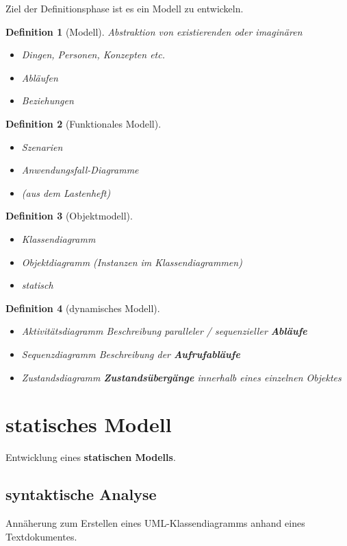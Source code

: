 \documentclass[a4paper]{article}
\theoremstyle{break}
\newtheorem{defi}{Definition}[section]
\begin{document}
Ziel der Definitionsphase ist es ein Modell zu entwickeln. 

\begin{defi}[Modell]
	Abstraktion von existierenden oder imaginären
	\begin{itemize}
		\item Dingen, Personen, Konzepten etc.
		\item Abläufen
		\item Beziehungen
	\end{itemize}

\end{defi}

\begin{defi}[Funktionales Modell]
	\begin{itemize}
		\item Szenarien
		\item Anwendungsfall-Diagramme
		\item (aus dem Lastenheft)
	\end{itemize}
	
\end{defi} 
\begin{defi}[Objektmodell]
	\begin{itemize}
		\item Klassendiagramm
		\item Objektdiagramm (Instanzen im Klassendiagrammen)
		\item statisch
	\end{itemize}
\end{defi}
\begin{defi}[dynamisches Modell]
	\begin{itemize}
	\item Aktivitätsdiagramm
	\subitem Beschreibung paralleler / sequenzieller \textbf{Abläufe}
	\item Sequenzdiagramm
	\subitem Beschreibung der \textbf{Aufrufabläufe}
	\item Zustandsdiagramm
	\subitem \textbf{Zustandsübergänge} innerhalb eines einzelnen Objektes
\end{itemize}
\end{defi} 

\section{statisches Modell}
Entwicklung eines \textbf{statischen Modells}. 
\subsection{syntaktische Analyse}
Annäherung zum Erstellen eines UML-Klassendiagramms anhand eines Textdokumentes.\\
	
\end{document}
